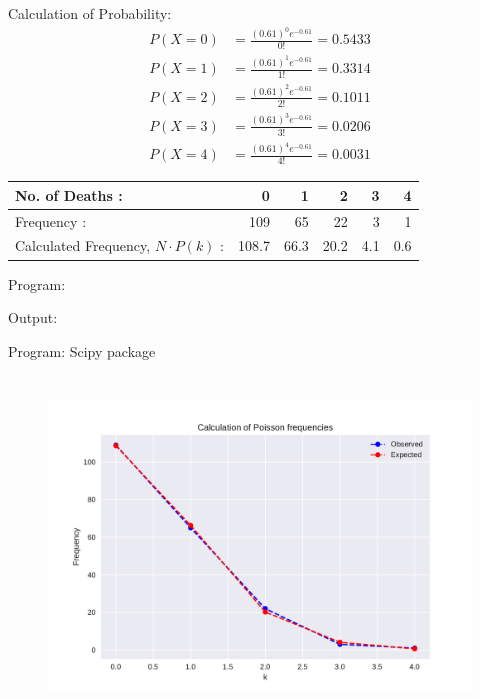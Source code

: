 \documentclass[a4paper,10pt,openright]{report}
\begin{document}
\begin{enumerate}
Calculation of Probability:
\begin{equation*}
		\begin{split}
				P(X = 0) & = \frac{(0.61)^{0} e^{-0.61}}{0!} = 0.5433 \\
				P(X = 1) & = \frac{(0.61)^{1} e^{-0.61}}{1!} = 0.3314 \\
				P(X = 2) & = \frac{(0.61)^{2} e^{-0.61}}{2!} = 0.1011 \\
				P(X = 3) & = \frac{(0.61)^{3} e^{-0.61}}{3!} = 0.0206 \\
				P(X = 4) & = \frac{(0.61)^{4} e^{-0.61}}{4!} = 0.0031
		\end{split}
\end{equation*}

\begin{tabular}{|l|r|r|r|r|r|}
\hline
No. of Deaths : & 0 & 1 & 2 & 3 & 4 \\
\hline
Frequency : & 109 & 65 & 22 & 3 & 1 \\
\hline
Calculated Frequency, $N \cdot P(k)$ : & 108.7 & 66.3 & 20.2 & 4.1 & 0.6 \\
\hline
\end{tabular}

Program:


Output:


Program: Scipy package


\begin{figure}[ht!]
\includegraphics[width=18cm,height=9cm,keepaspectratio]{frequency.pdf}
\centering
\end{figure}

\end{enumerate}
\end{document}
